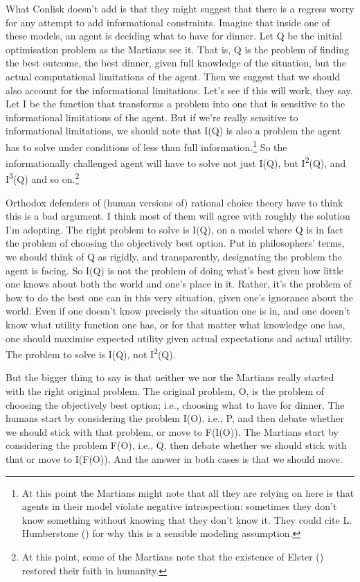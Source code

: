 \documentclass[
  10pt,
  letterpaper,
  twoside]{scrbook}
\begin{document}
What Conlisk doesn't add is that they might suggest that there is a
regress worry for any attempt to add informational constraints. Imagine
that inside one of these models, an agent is deciding what to have for
dinner. Let Q be the initial optimisation problem as the Martians see
it. That is, Q is the problem of finding the best outcome, the best
dinner, given full knowledge of the situation, but the actual
computational limitations of the agent. Then we suggest that we should
also account for the informational limitations. Let's see if this will
work, they say. Let I be the function that transforms a problem into one
that is sensitive to the informational limitations of the agent. But if
we're really sensitive to informational limitations, we should note that
I(Q) is also a problem the agent has to solve under conditions of less
than full information.\footnote{At this point the Martians might note
  that all they are relying on here is that agents in their model
  violate negative introspection: sometimes they don't know something
  without knowing that they don't know it. They could cite L.
  Humberstone () for why
  this is a sensible modeling assumption.} So the informationally
challenged agent will have to solve not just I(Q), but
I\textsuperscript{2}(Q), and I\textsuperscript{3}(Q) and so
on.\footnote{At this point, some of the Martians note that the existence
  of Elster () restored their faith in
  humanity.}

Orthodox defenders of (human versions of) rational choice theory have to
think this is a bad argument. I think most of them will agree with
roughly the solution I'm adopting. The right problem to solve is I(Q),
on a model where Q is in fact the problem of choosing the objectively
best option. Put in philosophers' terms, we should think of Q as
rigidly, and transparently, designating the problem the agent is facing.
So I(Q) is not the problem of doing what's best given how little one
knows about both the world and one's place in it. Rather, it's the
problem of how to do the best one can in this very situation, given
one's ignorance about the world. Even if one doesn't know precisely the
situation one is in, and one doesn't know what utility function one has,
or for that matter what knowledge one has, one should maximise expected
utility given actual expectations and actual utility. The problem to
solve is I(Q), not I\textsuperscript{2}(Q).

But the bigger thing to say is that neither we nor the Martians really
started with the right original problem. The original problem, O, is the
problem of choosing the objectively best option; i.e., choosing what to
have for dinner. The humans start by considering the problem I(O), i.e.,
P, and then debate whether we should stick with that problem, or move to
F(I(O)). The Martians start by considering the problem F(O), i.e., Q,
then debate whether we should stick with that or move to I(F(O)). And
the answer in both cases is that we should move.
\end{document}

